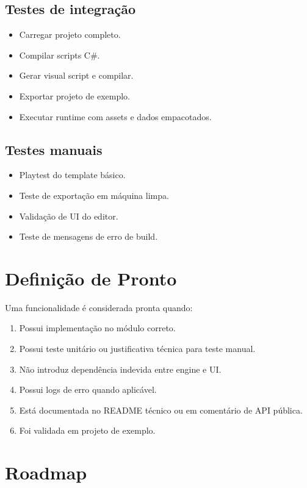 \documentclass[12pt,a4paper]{article}
\begin{document}
\subsection{Testes de integração}

\begin{itemize}
    \item Carregar projeto completo.
    \item Compilar scripts C\#.
    \item Gerar visual script e compilar.
    \item Exportar projeto de exemplo.
    \item Executar runtime com assets e dados empacotados.
\end{itemize}

\subsection{Testes manuais}

\begin{itemize}
    \item Playtest do template básico.
    \item Teste de exportação em máquina limpa.
    \item Validação de UI do editor.
    \item Teste de mensagens de erro de build.
\end{itemize}

\section{Definição de Pronto}

Uma funcionalidade é considerada pronta quando:

\begin{enumerate}
    \item Possui implementação no módulo correto.
    \item Possui teste unitário ou justificativa técnica para teste manual.
    \item Não introduz dependência indevida entre engine e UI.
    \item Possui logs de erro quando aplicável.
    \item Está documentada no README técnico ou em comentário de API pública.
    \item Foi validada em projeto de exemplo.
\end{enumerate}

\section{Roadmap}
\end{document}
